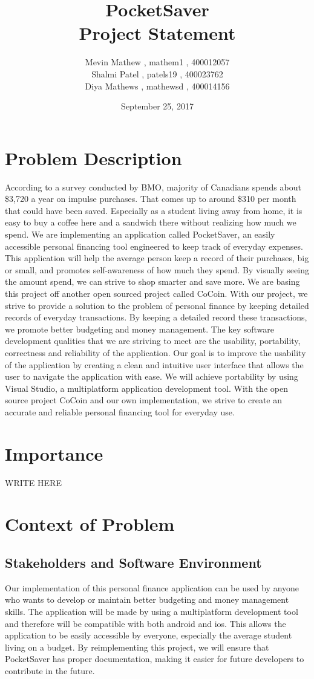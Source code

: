\documentclass[12pt]{article}
\title{PocketSaver \\ Project Statement}
\author{Mevin Mathew , mathem1 , 400012057 \\ Shalmi Patel , patels19 , 400023762 \\ Diya Mathews , mathewsd , 400014156}
\date{September 25, 2017}
\begin{document}
\maketitle
\newpage
\tableofcontents

\newpage

\section{Problem Description}
According to a survey conducted by BMO, majority of Canadians spends about \$3,720 a year on impulse purchases. That comes up to around \$310 per month that could have been saved. Especially as a student living away from home, it is easy to buy a coffee here and a sandwich there without realizing how much we spend. We are implementing an application called PocketSaver, an easily accessible personal financing tool engineered to keep track of everyday expenses. This application will help the average person keep a record of their purchases, big or small, and promotes self-awareness of how much they spend. By visually seeing the amount spend, we can strive to shop smarter and save more. We are basing this project off another open sourced project called CoCoin. With our project, we strive to provide a solution to the problem of personal finance by keeping detailed records of everyday transactions. By keeping a detailed record these transactions, we promote better budgeting and money management. The key software development qualities that we are striving to meet are the usability, portability, correctness and reliability of the application. Our goal is to improve the usability of the application by creating a clean and intuitive user interface that allows the user to navigate the application with ease. We will achieve portability by using Visual Studio, a multiplatform application development tool. With the open source project CoCoin and our own implementation, we strive to create an accurate and reliable personal financing tool for everyday use.

\section{Importance}
WRITE HERE

\section{Context of Problem}
\subsection{Stakeholders and Software Environment}
Our implementation of this personal finance application can be used by anyone who wants to develop or maintain better budgeting and money management skills. The application will be made by using a multiplatform development tool and therefore will be compatible with both android and ios. This allows the application to be easily accessible by everyone, especially the average student living on a budget. By reimplementing this project, we will ensure that PocketSaver has proper documentation, making it easier for future developers to contribute in the future.
\end{document}
